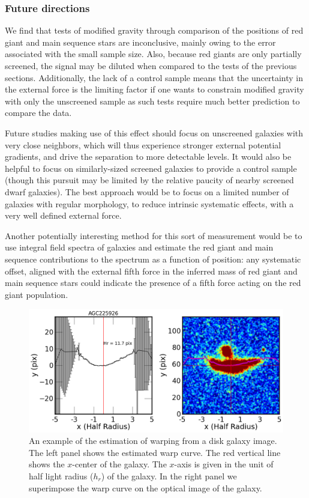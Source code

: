 \documentclass[twocolappendix, numberedappendix]{emulateapj}
\begin{document}
\subsubsection{Future directions}
We find that tests of modified gravity through
comparison of the positions of red giant and main sequence stars
are inconclusive, mainly owing to the error associated with the
small sample size.  Also, because red giants are only
partially screened, the signal may be diluted when compared to
the tests of the previous sections.
Additionally, the lack of a control sample means that
the uncertainty in the external force is the limiting factor
if one wants to constrain modified gravity with only the unscreened sample as
such tests require much better prediction to compare the data. 

Future studies making use of this effect should focus on unscreened galaxies
with very close neighbors, which will thus experience stronger external
potential gradients, and drive the separation to more detectable levels.
It would also be helpful to focus on similarly-sized screened galaxies to
provide a control sample (though this pursuit may be limited by the relative
paucity of nearby screened dwarf galaxies).  
The best approach would be to focus on a limited number of galaxies with
regular morphology, to reduce intrinsic systematic effects, with a very well defined
external force.

Another potentially interesting method 
for this sort of measurement would be to use integral field
spectra of galaxies and estimate the red giant and main sequence contributions
to the spectrum as a function of position: any systematic offset, aligned with
the external fifth force in the inferred mass of red giant and main sequence
stars could indicate the presence of a fifth force acting on the red giant
population.



\begin{figure}
\begin{center}
  \includegraphics[scale=0.5]{figures/AGC225926-warp-curve.png}
\caption{An example of the estimation of warping from a disk galaxy image. 
The left panel shows the estimated warp curve. The red
vertical line shows the $x$-center of the galaxy. The $x$-axis is given in the unit
of half light radius ($h_r$) of the galaxy. In the right panel we superimpose
the warp curve on the optical image of the galaxy. %
}
\label{warp-eg}
\end{center}
\end{figure}
\end{document}
